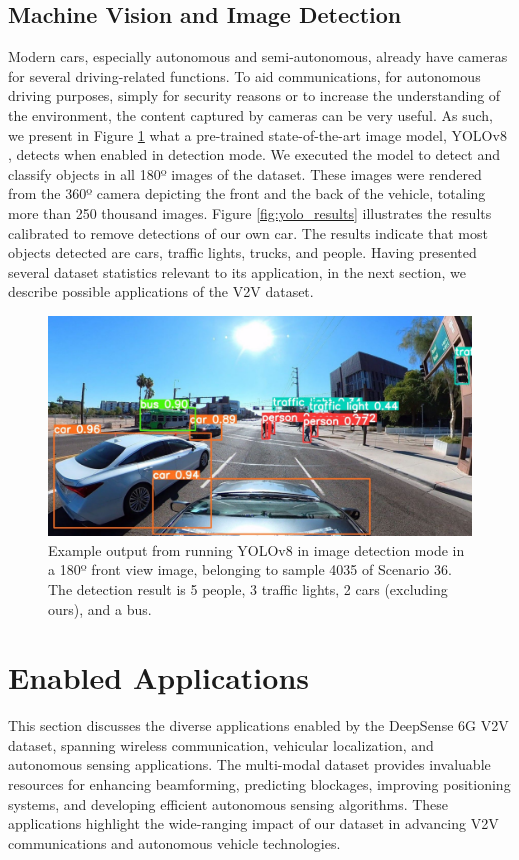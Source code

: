 \documentclass[10pt,comsoc]{IEEEtran}
\begin{document}
\subsection{Machine Vision and Image Detection} \label{subsec:img_detection}

Modern cars, especially autonomous and semi-autonomous, already have cameras for several driving-related functions. To aid communications, for autonomous driving purposes, simply for security reasons or to increase the understanding of the environment, the content captured by cameras can be very useful. As such, we present in Figure \ref{fig:yolo_example} what a pre-trained state-of-the-art image model, YOLOv8 \cite{YOLOv8}, detects when enabled in detection mode. We executed the model to detect and classify objects in all 180º images of the dataset. These images were rendered from the 360º camera depicting the front and the back of the vehicle, totaling more than 250 thousand images. Figure \ref{fig:yolo_results} illustrates the results calibrated to remove detections of our own car. The results indicate that most objects detected are cars, traffic lights, trucks, and people. Having presented several dataset statistics relevant to its application, in the next section, we describe possible applications of the V2V dataset. 

\begin{figure}[t]
	\centering
	\includegraphics[width=1\columnwidth]{yolo_example2}
	\caption{Example output from running YOLOv8 in image detection mode in a 180º front view image, belonging to sample 4035 of Scenario 36. The detection result is 5 people, 3 traffic lights, 2 cars (excluding ours), and a bus.}
	\label{fig:yolo_example}
\end{figure}

\section{Enabled Applications} \label{sec:enabled_applications}
This section discusses the diverse applications enabled by the DeepSense 6G V2V dataset, spanning wireless communication, vehicular localization, and autonomous sensing applications. The multi-modal dataset provides invaluable resources for enhancing beamforming, predicting blockages, improving positioning systems, and developing efficient autonomous sensing algorithms. These applications highlight the wide-ranging impact of our dataset in advancing V2V communications and autonomous vehicle technologies.
\end{document}
